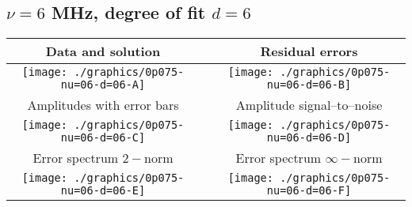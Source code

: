 

% 

\clearpage{}
\break{}

\subsection{$\nu = 6$ MHz, degree of fit $d = 6$}

\begin{table}[h]
    \begin{center}
        \begin{tabular}{ccc}
            Data and solution & \quad & Residual errors \\\hline
            \texttt{[image: ./graphics/0p075-nu=06-d=06-A]} &&
            \texttt{[image: ./graphics/0p075-nu=06-d=06-B]} \\[15pt]
            Amplitudes with error bars && Amplitude signal--to--noise \\\hline
            \texttt{[image: ./graphics/0p075-nu=06-d=06-C]} &&
            \texttt{[image: ./graphics/0p075-nu=06-d=06-D]} \\[15pt]
            Error spectrum $2-$norm && Error spectrum $\infty-$norm \\\hline
            \texttt{[image: ./graphics/0p075-nu=06-d=06-E]} &&
            \texttt{[image: ./graphics/0p075-nu=06-d=06-F]} \\[15pt]
        \end{tabular}
    \end{center}
\label{fig:elev=75, nu=6}
\end{table}



\endinput
